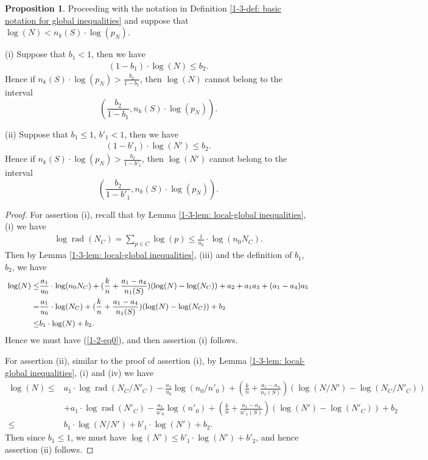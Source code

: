 \documentclass[a4paper, 12pt]{article}
\DeclareMathOperator{\rad}{\text{rad}}
\numberwithin{equation}{section}
\theoremstyle{definition}
\newtheorem{prop}[thm]{Proposition}
\begin{document}
\begin{prop} \label{1-3-prop: local-global inequalities}
Proceeding with the notation in Definition \ref{1-3-def: basic notation for global inequalities} and suppose that $\log(N) < n_k(S) \cdot \log(p_N)$.

(i) Suppose that $b_1 < 1$, then we have
\begin{align} \label{1-2-eq0}
(1-b_1) \cdot \log(N) \le b_2 .
\end{align}
Hence if $n_k(S)\cdot \log(p_N) > \frac{b_2}{1-b_1}$, then $\log(N)$ cannot belong to the interval $$(\frac{b_2}{1-b_1}, n_k(S)\cdot \log(p_N) ) .$$

(ii) Suppose that $b_1 \le 1$, $b'_1 < 1$, then we have
\begin{align*}
(1-b'_1) \cdot \log(N') \le b_2 .
\end{align*}
Hence if $n_k(S)\cdot \log(p_N) > \frac{b_2}{1-b'_1}$, then $\log(N')$ cannot belong to the interval $$(\frac{b_2}{1-b'_1}, n_k(S)\cdot \log(p_N) ) .$$

\end{prop}
\begin{proof}
For assertion (i), recall that by Lemma \ref{1-3-lem: local-global inequalities}, (i) we have 
\small\begin{align*}
\log\rad(N_C) = \sum_{p\in C} \log(p) \le \frac{1}{u_0}\cdot \log(n_0 N_C) .
\end{align*}\normalsize
Then by Lemma \ref{1-3-lem: local-global inequalities}, (iii) and the definition of $b_1$, $b_2$, we have
\begin{equation*} \small
\begin{aligned}
\log(N) \le&  \frac{a_1}{u_0}\cdot\log(n_0 N_C) + (\frac{k}{n}+ \frac{a_1-a_4}{n_1(S)})(\log(N)-\log(N_C))
+ a_2 + a_1a_3 + (a_1-a_4)a_5 
\\ =& \frac{a_1}{u_0}\cdot \log(N_C) + (\frac{k}{n}+ \frac{a_1-a_4}{n_1(S)})(\log(N)-\log(N_C)) + b_2 
\\ \le& b_1\cdot \log(N) + b_2 .
\end{aligned}
\end{equation*}
Hence we must have (\ref{1-2-eq0}), and then assertion (i) follows.

For assertion (ii),  similar to the proof of assertion (i), by Lemma \ref{1-3-lem: local-global inequalities}, (i) and (iv) we have
\small\begin{align*}
\log(N) \le &  a_1 \cdot \log\rad(N_C/N'_C) - \frac{a_1}{u_0}\log(n_0/n'_0) 
+ (\frac{k}{n} + \frac{a_1-a_4}{n_1(S)})(\log(N/N')-\log(N_C/N'_C))
\\ & +  a_1 \cdot \log\rad(N'_C) - \frac{a_1}{u'_0}\log(n'_0) + (\frac{k}{n} + \frac{a_1-a_4}{n'_1(S)})(\log(N')-\log(N'_C))
+ b_2 
\\ \le &  b_1 \cdot \log(N/N') + b'_1 \cdot \log(N') + b_2 .
\end{align*}\normalsize
Then since $b_1 \le 1$, we must have $\log(N') \le b'_1 \cdot \log(N') + b'_2$, and hence assertion (ii) follows.
\end{proof}
\end{document}

